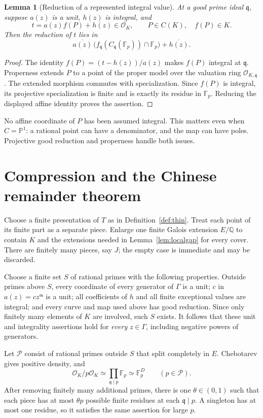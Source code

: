 \documentclass[11pt,a4paper]{article}
\newtheorem{lemma}[theorem]{Lemma}
\theoremstyle{definition}
\theoremstyle{remark}
\newcommand{\Q}{\mathbb Q}
\newcommand{\F}{\mathbb F}
\newcommand{\Pone}{\mathbb P^1}
\newcommand{\OK}{\mathcal O_K}
\newcommand{\cP}{\mathcal P}
\begin{document}
\begin{lemma}[Reduction of a represented integral value]\label{lem:proper}
At a good prime ideal $\mathfrak q$, suppose $a(z)$ is a unit,
$h(z)$ is integral, and
\[
 t=a(z)f(P)+h(z)\in\OK,\qquad P\in C(K),\quad f(P)\in K.
\]
Then the reduction of $t$ lies in
\[
 \overline{a(z)}\,
   \bigl(f_{\mathfrak q}(C_{\mathfrak q}(\F_p))\cap\F_p\bigr)
       +\overline{h(z)}.
\]
\end{lemma}
\begin{proof}
The identity $f(P)=(t-h(z))/a(z)$ makes $f(P)$ integral at
$\mathfrak q$. Properness extends $P$ to a point of the proper model
over the valuation ring $\mathcal O_{K,\mathfrak q}$. The extended morphism
commutes with specialization. Since $f(P)$ is integral, its projective
specialization is finite and is exactly its residue in $\F_p$.
Reducing the displayed affine identity proves the assertion.
\end{proof}

No affine coordinate of $P$ has been assumed integral. This matters even
when $C=\Pone$: a rational point can have a denominator, and the map can
have poles. Projective good reduction and properness handle both issues.

\section{Compression and the Chinese remainder theorem}

Choose a finite presentation of $T$ as in Definition~\ref{def:thin}.
Treat each point of its finite part as a separate piece. Enlarge one
finite Galois extension $E/\Q$ to contain $K$ and the extensions needed
in Lemma~\ref{lem:localgap} for every cover. There are finitely many
pieces, say $J$; the empty case is immediate and may be discarded.

Choose a finite set $S$ of rational primes with the following properties.
Outside primes above $S$, every coordinate of every generator of $\Gamma$
is a unit; $c$ in $a(z)=cz^{\boldsymbol\alpha}$ is a unit; all coefficients
of $h$ and all finite exceptional values are integral; and every curve
and map used above has good reduction. Since only finitely many elements
of $K$ are involved, such $S$ exists. It follows that these unit and
integrality assertions hold for \emph{every} $z\in\Gamma$, including
negative powers of generators.

Let $\cP$ consist of rational primes outside $S$ that split completely in
$E$. Chebotarev gives positive density, and
\begin{equation}\label{eq:split}
 \OK/p\OK\simeq\prod_{\mathfrak q\mid p}\F_p\simeq\F_p^D
 \qquad(p\in\cP).
\end{equation}
After removing finitely many additional primes, there is one
$\theta\in(0,1)$ such that each piece has at most $\theta p$ possible
finite residues at each $\mathfrak q\mid p$. A singleton has at most one
residue, so it satisfies the same assertion for large $p$.
\end{document}
